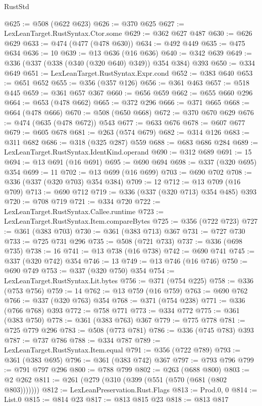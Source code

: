 \begin{lexlean}{RustStd}
\begin{coremodule}
@625 := @508 (@622 @623)
@626 := @370 @625
@627 := LexLeanTarget.RustSyntax.Ctor.some
@629 := @362 @627 @487
@630 := @626 @629
@633 := @474 (@477 (@478 @630))
@634 := @492 @449
@635 := @475 @634
@636 := 10
@639 := @13 @636 (@16 @636)
@640 := @342 @639
@649 := @336 (@337 (@338 (@340 (@320 @640) @349)) @354 @384) @393
@650 := @334 @649
@651 := LexLeanTarget.RustSyntax.Expr.cond
@652 := @383 @640
@653 := @651 @652
@655 := @356 (@357 @126)
@656 := @361 @463
@657 := @518 @445
@659 := @361 @657 @367
@660 := @656 @659
@662 := @655 @660 @296
@664 := @653 (@478 @662)
@665 := @372 @296
@666 := @371 @665
@668 := @664 (@478 @666)
@670 := @508 (@650 @668)
@672 := @370 @670 @629
@676 := @474 (@635 (@478 @672)) @543
@677 := @633 @676
@678 := @607 @677
@679 := @605 @678
@681 := @263 (@574 @679)
@682 := @314 @126
@683 := @311 @682
@686 := @318 (@325 @287) @559
@688 := @683 @686 @284
@689 := LexLeanTarget.RustSyntax.IdentKind.operand
@690 := @312 @689
@691 := 15
@694 := @13 @691 (@16 @691)
@695 := @690 @694
@698 := @337 (@320 @695) @354
@699 := 11
@702 := @13 @699 (@16 @699)
@703 := @690 @702
@708 := @336 (@337 (@320 @703) @354 @384)
@709 := 12
@712 := @13 @709 (@16 @709)
@713 := @690 @712
@719 := @336 (@337 (@320 @713) @354 @485) @393
@720 := @708 @719
@721 := @334 @720
@722 := LexLeanTarget.RustSyntax.Callee.runtime
@723 := LexLeanTarget.RustSyntax.Item.compareBytes
@725 := @356 (@722 @723)
@727 := @361 (@383 @703)
@730 := @361 (@383 @713) @367
@731 := @727 @730
@733 := @725 @731 @296
@735 := @508 (@721 @733)
@737 := @336 (@698 @735)
@738 := 16
@741 := @13 @738 (@16 @738)
@742 := @690 @741
@745 := @337 (@320 @742) @354
@746 := 13
@749 := @13 @746 (@16 @746)
@750 := @690 @749
@753 := @337 (@320 @750) @354
@754 := LexLeanTarget.RustSyntax.Lit.bytes
@756 := @371 (@754 @225)
@758 := @336 (@753 @756)
@759 := 14
@762 := @13 @759 (@16 @759)
@763 := @690 @762
@766 := @337 (@320 @763) @354
@768 := @371 (@754 @238)
@771 := @336 (@766 @768) @393
@772 := @758 @771
@773 := @334 @772
@775 := @361 (@383 @750)
@778 := @361 (@383 @763) @367
@779 := @775 @778
@781 := @725 @779 @296
@783 := @508 (@773 @781)
@786 := @336 (@745 @783) @393
@787 := @737 @786
@788 := @334 @787
@789 := LexLeanTarget.RustSyntax.Item.equal
@791 := @356 (@722 @789)
@793 := @361 (@383 @695)
@796 := @361 (@383 @742) @367
@797 := @793 @796
@799 := @791 @797 @296
@800 := @788 @799
@802 := @263 (@688 @800)
@803 := @2 @262
@811 := @261 (@279 (@310 (@399 (@551 (@570 (@681 (@802 @803)))))))
@812 := LexLeanPreservation.Rust.Flags
@813 := Prod.{0, 0}
@814 := List.{0}
@815 := @814 @23
@817 := @813 @815 @23
@818 := @813 @817

\end{coremodule}
\end{lexlean}
